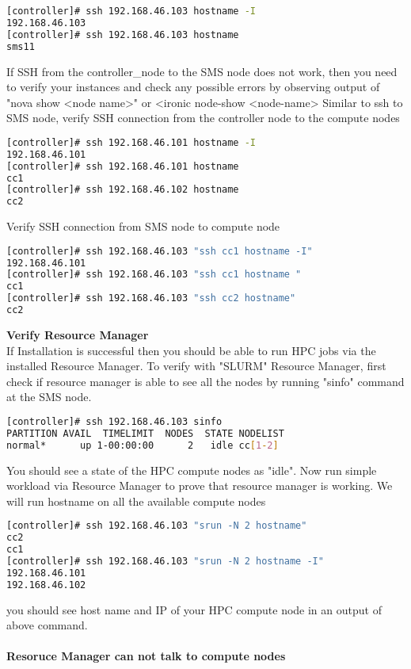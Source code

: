 \begin{lstlisting}[language=bash,keywords={},upquote=true]
[controller]# ssh 192.168.46.103 hostname -I
192.168.46.103
[controller]# ssh 192.168.46.103 hostname 
sms11
\end{lstlisting}
If SSH from the controller\_node to the SMS node does not work, then you need to verify your instances and check any possible errors by observing output of "nova show <node name>" or <ironic node-show <node-name>
Similar to ssh to SMS node, verify SSH connection from the controller node to the compute nodes
\begin{lstlisting}[language=bash,keywords={},upquote=true]
[controller]# ssh 192.168.46.101 hostname -I
192.168.46.101
[controller]# ssh 192.168.46.101 hostname 
cc1
[controller]# ssh 192.168.46.102 hostname
cc2
\end{lstlisting}
Verify SSH connection from SMS node to compute node
\begin{lstlisting}[language=bash,keywords={},upquote=true]
[controller]# ssh 192.168.46.103 "ssh cc1 hostname -I"
192.168.46.101
[controller]# ssh 192.168.46.103 "ssh cc1 hostname "
cc1
[controller]# ssh 192.168.46.103 "ssh cc2 hostname" 
cc2
\end{lstlisting}
\textbf{Verify Resource Manager}\\
If Installation is successful then you should be able to run HPC jobs via the installed Resource Manager. To verify with "SLURM" Resource Manager, first check if resource manager is able to see all the nodes by running "sinfo" command at the SMS node. 
\begin{lstlisting}[language=bash,keywords={},upquote=true]
[controller]# ssh 192.168.46.103 sinfo
PARTITION AVAIL  TIMELIMIT  NODES  STATE NODELIST
normal*      up 1-00:00:00      2   idle cc[1-2]
\end{lstlisting}
You should see a state of the HPC compute nodes as "idle". Now run simple workload via Resource Manager to prove that resource manager is working. We will run hostname on all the available compute nodes
\begin{lstlisting}[language=bash,keywords={},upquote=true]
[controller]# ssh 192.168.46.103 "srun -N 2 hostname"
cc2
cc1
[controller]# ssh 192.168.46.103 "srun -N 2 hostname -I"
192.168.46.101 
192.168.46.102
\end{lstlisting}
you should see host name and IP of your HPC compute node in an output of above command. \\
\\
\textbf{Resoruce Manager can not talk to compute nodes}\\

